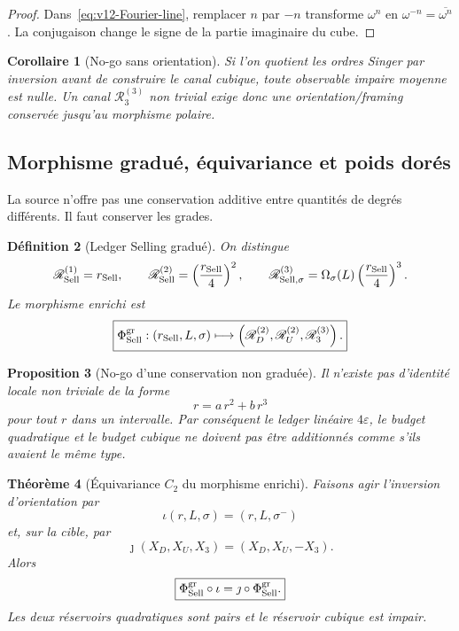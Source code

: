 \documentclass[11pt,a4paper]{article}
\newtheorem{theorem}{Théorème}[section]
\newtheorem{proposition}[theorem]{Proposition}
\newtheorem{corollary}[theorem]{Corollaire}
\newtheorem{definition}[theorem]{Définition}
\begin{document}
\begin{proof}
Dans~\eqref{eq:v12-Fourier-line}, remplacer $n$ par $-n$ transforme $\omega^n$ en $\omega^{-n}=\overline{\omega^n}$. La conjugaison change le signe de la partie imaginaire du cube.
\end{proof}

\begin{corollary}[No-go sans orientation]\label{cor:v12-orientation-no-go}
Si l'on quotient les ordres Singer par inversion avant de construire le canal cubique, toute observable impaire moyenne est nulle. Un canal $\mathscr R_3^{(3)}$ non trivial exige donc une orientation/framing conservée jusqu'au morphisme polaire.
\end{corollary}

\subsection{Morphisme gradué, équivariance et poids dorés}

La source n'offre pas une conservation additive entre quantités de degrés différents. Il faut conserver les grades.

\begin{definition}[Ledger Selling gradué]\label{def:v12-graded-ledger}
On distingue
\[
 \mathscr R_{\rm Sell}^{(1)}=r_{\rm Sell},
 \qquad
 \mathscr R_{\rm Sell}^{(2)}
 =\left(\frac{r_{\rm Sell}}4\right)^2,
 \qquad
 \mathscr R_{\rm Sell,\sigma}^{(3)}
 =\Omega_\sigma(L)\left(\frac{r_{\rm Sell}}4\right)^3.
\]
Le morphisme enrichi est
\begin{equation}\label{eq:v12-main-morphism}
 \boxed{
 \Phi_{\rm Sell}^{\rm gr}:
 (r_{\rm Sell},L,\sigma)
 \longmapsto
 \left(
 \mathscr R_D^{(2)},
 \mathscr R_U^{(2)},
 \mathscr R_3^{(3)}
 \right).}
\end{equation}
\end{definition}

\begin{proposition}[No-go d'une conservation non graduée]\label{prop:v12-ungraded-nogo}
Il n'existe pas d'identité locale non triviale de la forme
\[
 r=a\,r^2+b\,r^3
\]
pour tout $r$ dans un intervalle. Par conséquent le ledger linéaire $4\varepsilon$, le budget quadratique et le budget cubique ne doivent pas être additionnés comme s'ils avaient le même type.
\end{proposition}

\begin{theorem}[Équivariance $C_2$ du morphisme enrichi]\label{thm:v12-C2}
Faisons agir l'inversion d'orientation par
\[
 \iota(r,L,\sigma)=(r,L,\sigma^-)
\]
et, sur la cible, par
\[
 \jmath(X_D,X_U,X_3)=(X_D,X_U,-X_3).
\]
Alors
\begin{equation}\label{eq:v12-C2}
 \boxed{
 \Phi_{\rm Sell}^{\rm gr}\circ\iota
 =
 \jmath\circ\Phi_{\rm Sell}^{\rm gr}.}
\end{equation}
Les deux réservoirs quadratiques sont pairs et le réservoir cubique est impair.
\end{theorem}
\end{document}
